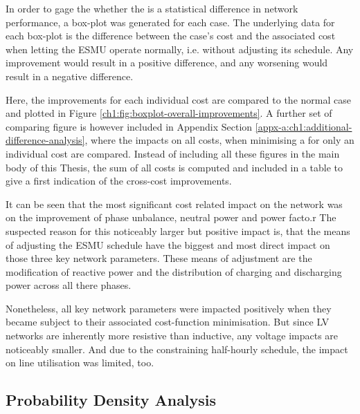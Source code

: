 In order to gage the whether the is a statistical difference in network performance, a box-plot was generated for each case.
The underlying data for each box-plot is the difference between the case's cost and the associated cost when letting the ESMU operate normally, i.e. without adjusting its schedule.
Any improvement would result in a positive difference, and any worsening would result in a negative difference.

Here, the improvements for each individual cost are compared to the normal case and plotted in Figure \ref{ch1:fig:boxplot-overall-improvements}.
A further set of comparing figure is however included in Appendix Section \ref{appx-a:ch1:additional-difference-analysis}, where the impacts on all costs, when minimising a for only an individual cost are compared.
Instead of including all these figures in the main body of this Thesis, the sum of all costs is computed and included in a table to give a first indication of the cross-cost improvements.



It can be seen that the most significant cost related impact on the network was on the improvement of phase unbalance, neutral power and power facto.r
The suspected reason for this noticeably larger but positive impact is, that the means of adjusting the ESMU schedule have the biggest and most direct impact on those three key network parameters.
These means of adjustment are the modification of reactive power and the distribution of charging and discharging power across all there phases.

Nonetheless, all key network parameters were impacted positively when they became subject to their associated cost-function minimisation.
But since LV networks are inherently more resistive than inductive, any voltage impacts are noticeably smaller.
And due to the constraining half-hourly schedule, the impact on line utilisation was limited, too.





\subsection{Probability Density Analysis}
\label{ch1:subsec:probability-density-analysis}


